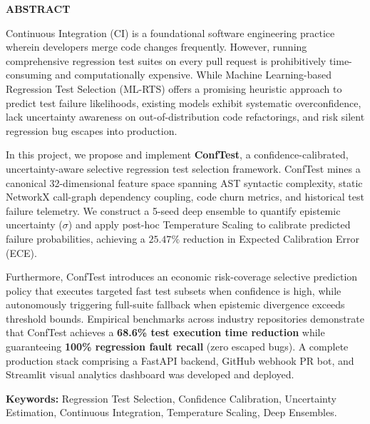 \clearpage
\begin{center}
    {\Large \textbf{ABSTRACT}\par}
\end{center}
\vspace{1.0cm}

Continuous Integration (CI) is a foundational software engineering practice wherein developers merge code changes frequently. However, running comprehensive regression test suites on every pull request is prohibitively time-consuming and computationally expensive. While Machine Learning-based Regression Test Selection (ML-RTS) offers a promising heuristic approach to predict test failure likelihoods, existing models exhibit systematic overconfidence, lack uncertainty awareness on out-of-distribution code refactorings, and risk silent regression bug escapes into production.

In this project, we propose and implement \textbf{ConfTest}, a confidence-calibrated, uncertainty-aware selective regression test selection framework. ConfTest mines a canonical 32-dimensional feature space spanning AST syntactic complexity, static NetworkX call-graph dependency coupling, code churn metrics, and historical test failure telemetry. We construct a 5-seed deep ensemble to quantify epistemic uncertainty ($\sigma$) and apply post-hoc Temperature Scaling to calibrate predicted failure probabilities, achieving a $25.47\%$ reduction in Expected Calibration Error (ECE).

Furthermore, ConfTest introduces an economic risk-coverage selective prediction policy that executes targeted fast test subsets when confidence is high, while autonomously triggering full-suite fallback when epistemic divergence exceeds threshold bounds. Empirical benchmarks across industry repositories demonstrate that ConfTest achieves a \textbf{68.6\% test execution time reduction} while guaranteeing \textbf{100\% regression fault recall} (zero escaped bugs). A complete production stack comprising a FastAPI backend, GitHub webhook PR bot, and Streamlit visual analytics dashboard was developed and deployed.

\vspace{0.5cm}
\noindent \textbf{Keywords:} Regression Test Selection, Confidence Calibration, Uncertainty Estimation, Continuous Integration, Temperature Scaling, Deep Ensembles.

\clearpage
